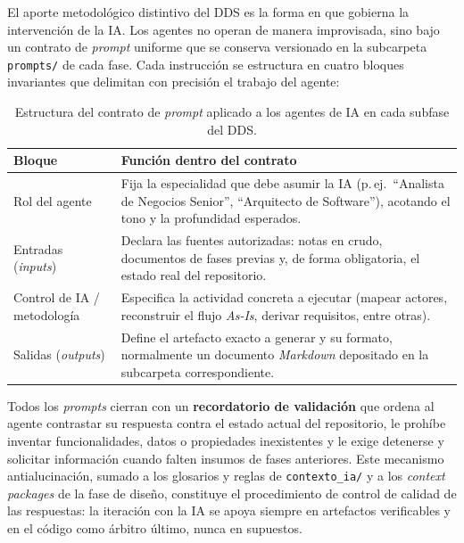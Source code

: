 El aporte metodológico distintivo del DDS es la forma en que gobierna la
intervención de la IA. Los agentes no operan de manera improvisada, sino bajo un
contrato de \textit{prompt} uniforme que se conserva versionado en la subcarpeta
\texttt{prompts/} de cada fase. Cada instrucción se estructura en cuatro bloques
invariantes que delimitan con precisión el trabajo del agente:

\begin{table}[htbp]
    \centering
    \caption{Estructura del contrato de \textit{prompt} aplicado a los agentes de IA en cada subfase del DDS.}
    \label{tab:contrato_prompt}
    \small
    \begin{tabularx}{\textwidth}{@{}l X@{}}
        \toprule
        \textbf{Bloque} & \textbf{Función dentro del contrato} \\
        \midrule
        Rol del agente & Fija la especialidad que debe asumir la IA (p.\,ej.\ ``Analista de Negocios Senior'', ``Arquitecto de Software''), acotando el tono y la profundidad esperados. \\
        Entradas (\textit{inputs}) & Declara las fuentes autorizadas: notas en crudo, documentos de fases previas y, de forma obligatoria, el estado real del repositorio. \\
        Control de IA / metodología & Especifica la actividad concreta a ejecutar (mapear actores, reconstruir el flujo \textit{As-Is}, derivar requisitos, entre otras). \\
        Salidas (\textit{outputs}) & Define el artefacto exacto a generar y su formato, normalmente un documento \textit{Markdown} depositado en la subcarpeta correspondiente. \\
        \bottomrule
    \end{tabularx}
\end{table}

Todos los \textit{prompts} cierran con un \textbf{recordatorio de validación} que
ordena al agente contrastar su respuesta contra el estado actual del repositorio,
le prohíbe inventar funcionalidades, datos o propiedades inexistentes y le exige
detenerse y solicitar información cuando falten insumos de fases anteriores. Este
mecanismo antialucinación, sumado a los glosarios y reglas de
\texttt{contexto\_ia/} y a los \textit{context packages} de la fase de diseño,
constituye el procedimiento de control de calidad de las respuestas: la iteración
con la IA se apoya siempre en artefactos verificables y en el código como árbitro
último, nunca en supuestos.


